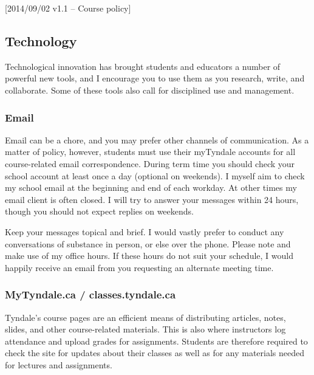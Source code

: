[2014/09/02 v1.1 -- Course policy]

\subsection{Technology}
\label{technology}

Technological innovation has brought students and educators a number of
powerful new tools, and I encourage you to use them as you research, write, and
collaborate. Some of these tools also call for disciplined use and management.

\subsubsection{Email}
\label{email}

Email can be a chore, and you may prefer other channels of communication. As a
matter of policy, however, students must use their myTyndale accounts for all
course-related email correspondence. During term time you should check your
school account at least once a day (optional on weekends). I myself aim to
check my school email at the beginning and end of each workday. At other times
my email client is often closed. I will try to answer your messages within 24
hours, though you should not expect replies on weekends.

Keep your messages topical and brief. I would vastly prefer to conduct any
conversations of substance in person, or else over the phone. Please note and
make use of my office hours. If these hours do not suit your schedule, I would
happily receive an email from you requesting an alternate meeting time.


\subsubsection{MyTyndale.ca / classes.tyndale.ca}
\label{mytyndale}

Tyndale's course pages are an efficient means of distributing articles, notes,
slides, and other course-related materials. This is also where instructors log
attendance and upload grades for assignments. Students are therefore required to
check the site for updates about their classes as well as for any materials
needed for lectures and assignments.

